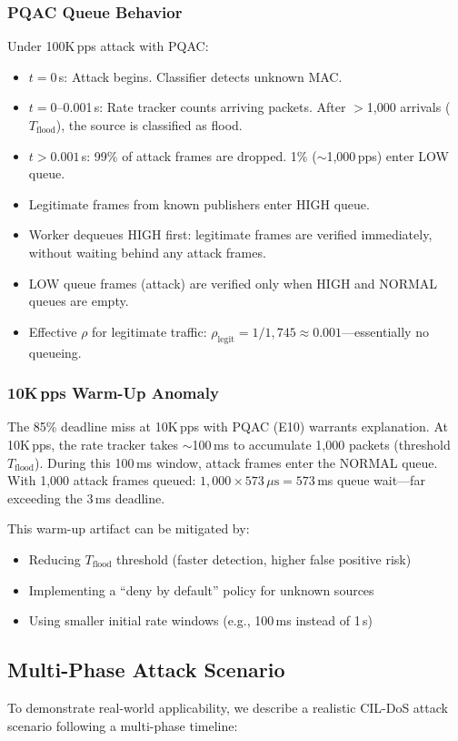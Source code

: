 \documentclass{ieeeaccess}
\begin{document}
\subsubsection{PQAC Queue Behavior}
Under 100K\,pps attack with PQAC:
\begin{itemize}[leftmargin=*]
    \item $t = 0$\,s: Attack begins. Classifier detects unknown MAC.
    \item $t = 0$--0.001\,s: Rate tracker counts arriving packets. After $>$1,000 arrivals ($T_{\text{flood}}$), the source is classified as flood.
    \item $t > 0.001$\,s: 99\% of attack frames are dropped. 1\% ($\sim$1,000\,pps) enter LOW queue.
    \item Legitimate frames from known publishers enter HIGH queue.
    \item Worker dequeues HIGH first: legitimate frames are verified immediately, without waiting behind any attack frames.
    \item LOW queue frames (attack) are verified only when HIGH and NORMAL queues are empty.
    \item Effective $\rho$ for legitimate traffic: $\rho_{\text{legit}} = 1/1{,}745 \approx 0.001$---essentially no queueing.
\end{itemize}

\subsubsection{10K\,pps Warm-Up Anomaly}
The 85\% deadline miss at 10K\,pps with PQAC (E10) warrants explanation. At 10K\,pps, the rate tracker takes $\sim$100\,ms to accumulate 1,000 packets (threshold $T_{\text{flood}}$). During this 100\,ms window, attack frames enter the NORMAL queue. With 1,000 attack frames queued: $1{,}000 \times 573\,\mu\text{s} = 573$\,ms queue wait---far exceeding the 3\,ms deadline.

This warm-up artifact can be mitigated by:
\begin{itemize}[leftmargin=*]
    \item Reducing $T_{\text{flood}}$ threshold (faster detection, higher false positive risk)
    \item Implementing a ``deny by default'' policy for unknown sources
    \item Using smaller initial rate windows (e.g., 100\,ms instead of 1\,s)
\end{itemize}

\subsection{Multi-Phase Attack Scenario}
To demonstrate real-world applicability, we describe a realistic CIL-DoS attack scenario following a multi-phase timeline:
\end{document}
